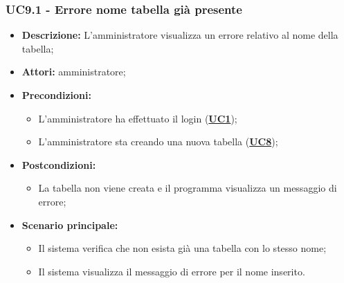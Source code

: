 \documentclass[5pt]{article}
\begin{document}
\subsubsection{UC9.1 - Errore nome tabella già presente}
\label{sec:UC9.1}
\begin{itemize}
	\item \textbf{Descrizione:} L’amministratore visualizza un errore relativo al nome della tabella;
	\item \textbf{Attori:} amministratore;
	\item \textbf{Precondizioni:} 
	\begin{itemize}
		\item L’amministratore ha effettuato il login (\hyperref[sec:UC1]{\textbf{UC1}});
		\item L’amministratore sta creando una nuova tabella (\hyperref[sec:UC1]{\textbf{UC8}});
	\end{itemize}
	\item \textbf{Postcondizioni:} 
	\begin{itemize}
		\item La tabella non viene creata e il programma visualizza un messaggio di errore;
	\end{itemize}
	\item \textbf{Scenario principale:} 
	\begin{itemize}
		\item Il sistema verifica che non esista già una tabella con lo stesso nome;
		\item Il sistema visualizza il messaggio di errore per il nome inserito.
	\end{itemize}
\end{itemize}
\end{document}
